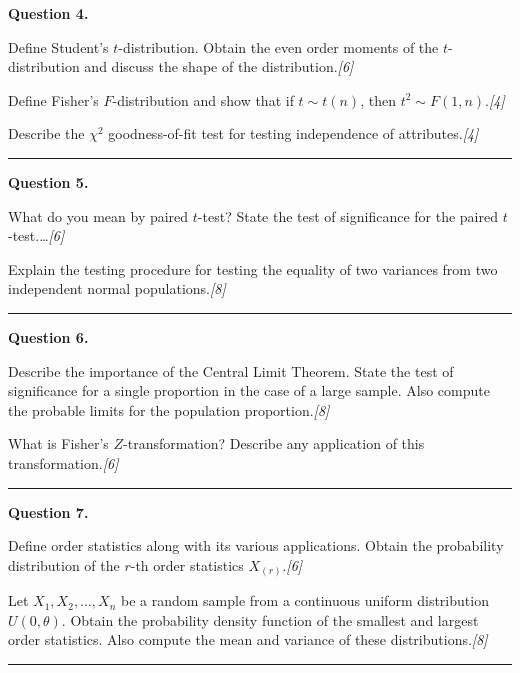 \documentclass[11pt,a4paper]{article}
\newcommand{\pts}[1]{\hfill   \textit{[#1]}}
\begin{document}
\medskip


\noindent   \textbf{Question 4.}

\begin{parts}
  \item Define Student's $t$-distribution. Obtain the even order moments of the $t$-distribution and discuss the shape of the distribution.\pts{6}
  \item Define Fisher's $F$-distribution and show that if $t \sim t(n)$, then $t^2 \sim F(1,n)$.\pts{4}
  \item Describe the $\chi^2$ goodness-of-fit test for testing independence of attributes.\pts{4}
\end{parts}
\medskip\rule{\linewidth}{0.2pt}

\medskip


\noindent   \textbf{Question 5.}

\begin{parts}
  \item What do you mean by paired $t$-test? State the test of significance for the paired $t$-test.\dots\pts{6}
  \item Explain the testing procedure for testing the equality of two variances from two independent normal populations.\pts{8}
\end{parts}
\medskip\rule{\linewidth}{0.2pt}

\medskip


\noindent   \textbf{Question 6.}

\begin{parts}
  \item Describe the importance of the Central Limit Theorem. State the test of significance for a single proportion in the case of a large sample. Also compute the probable limits for the population proportion.\pts{8}
  \item What is Fisher's $Z$-transformation? Describe any application of this transformation.\pts{6}
\end{parts}
\medskip\rule{\linewidth}{0.2pt}

\medskip


\noindent   \textbf{Question 7.}

\begin{parts}
  \item Define order statistics along with its various applications. Obtain the probability distribution of the $r$-th order statistics $X_{(r)}$.\pts{6}
  \item Let $X_1, X_2, \dots, X_n$ be a random sample from a continuous uniform distribution $U(0,  \theta)$. Obtain the probability density function of the smallest and largest order statistics. Also compute the mean and variance of these distributions.\pts{8}
\end{parts}
\medskip\rule{\linewidth}{0.2pt}
\end{document}
